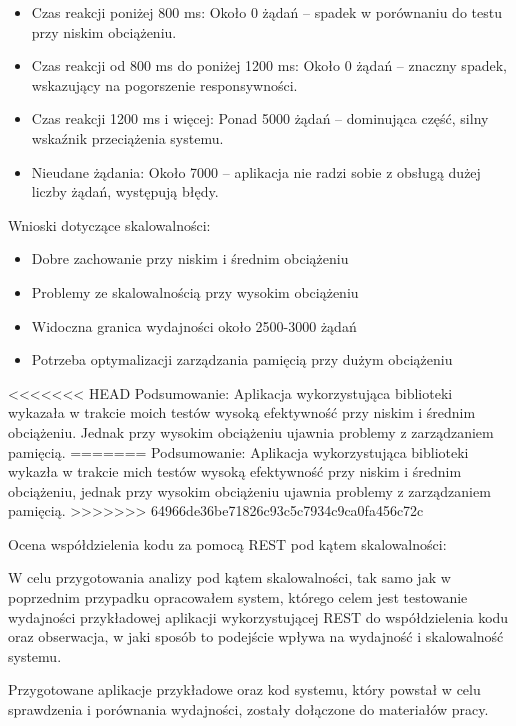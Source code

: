 \documentclass[runningheads,12pt]{llncs}
\begin{document}
\begin{itemize}
    \item Czas reakcji poniżej 800 ms: Około 0 żądań – spadek w porównaniu do testu przy niskim obciążeniu.
    \item Czas reakcji od 800 ms do poniżej 1200 ms: Około 0 żądań – znaczny spadek, wskazujący na pogorszenie responsywności.
    \item Czas reakcji 1200 ms i więcej: Ponad 5000 żądań – dominująca część, silny wskaźnik przeciążenia systemu.
    \item Nieudane żądania: Około 7000 – aplikacja nie radzi sobie z obsługą dużej liczby żądań, występują błędy.
\end{itemize}

Wnioski dotyczące skalowalności:
\begin{itemize}
    \item Dobre zachowanie przy niskim i średnim obciążeniu
    \item Problemy ze skalowalnością przy wysokim obciążeniu
    \item Widoczna granica wydajności około 2500-3000 żądań
    \item Potrzeba optymalizacji zarządzania pamięcią przy dużym obciążeniu
\end{itemize}

<<<<<<< HEAD
Podsumowanie: Aplikacja wykorzystująca biblioteki wykazała w trakcie moich testów wysoką efektywność przy niskim i średnim obciążeniu. Jednak przy wysokim obciążeniu ujawnia problemy z zarządzaniem pamięcią.
=======
Podsumowanie: Aplikacja wykorzystująca biblioteki wykazła w trakcie mich testów wysoką efektywność przy niskim i średnim obciążeniu, jednak przy wysokim obciążeniu ujawnia problemy z zarządzaniem pamięcią.
>>>>>>> 64966de36be71826c93c5c7934c9ca0fa456c72c

\newpage


Ocena współdzielenia kodu za pomocą REST pod kątem skalowalności:

W celu przygotowania analizy pod kątem skalowalności, tak samo jak w poprzednim przypadku opracowałem system, którego celem jest testowanie wydajności przykładowej aplikacji wykorzystującej REST do współdzielenia kodu oraz obserwacja, w jaki sposób to podejście wpływa na wydajność i skalowalność systemu.

Przygotowane aplikacje przykładowe oraz kod systemu, który powstał w celu sprawdzenia i porównania wydajności, zostały dołączone do materiałów pracy.
\end{document}
